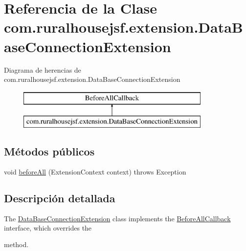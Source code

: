 \hypertarget{classcom_1_1ruralhousejsf_1_1extension_1_1_data_base_connection_extension}{}\section{Referencia de la Clase com.\+ruralhousejsf.\+extension.\+Data\+Base\+Connection\+Extension}
\label{classcom_1_1ruralhousejsf_1_1extension_1_1_data_base_connection_extension}
Diagrama de herencias de com.\+ruralhousejsf.\+extension.\+Data\+Base\+Connection\+Extension\begin{figure}[H]
\begin{center}
\leavevmode
\includegraphics[height=2.000000cm]{classcom_1_1ruralhousejsf_1_1extension_1_1_data_base_connection_extension}
\end{center}
\end{figure}
\subsection*{Métodos públicos}
\begin{DoxyCompactItemize}
\item 
void \mbox{\hyperlink{classcom_1_1ruralhousejsf_1_1extension_1_1_data_base_connection_extension_ae1fe703d5f0bdd5f29f0f4b9f0645e3e}{before\+All}} (Extension\+Context context)  throws Exception 
\end{DoxyCompactItemize}


\subsection{Descripción detallada}
The \mbox{\hyperlink{classcom_1_1ruralhousejsf_1_1extension_1_1_data_base_connection_extension}{Data\+Base\+Connection\+Extension}} class implements the \mbox{\hyperlink{}{Before\+All\+Callback}} interface, which overrides the
\begin{DoxyCode}{0}
\end{DoxyCode}


method. 

